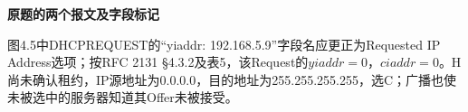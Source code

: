 {\color{ink}\bfseries 原题的两个报文及字段标记}\par\vspace{1bp}图4.5中DHCPREQUEST的“yiaddr: 192.168.5.9”字段名应更正为Requested IP Address选项；按RFC 2131 §4.3.2及表5，该Request的\(yiaddr=\allowbreak{}0\)，\(ciaddr=\allowbreak{}0\)。H尚未确认租约，IP源地址为0.0.0.0，目的地址为255.255.255.255，选C；广播也使未被选中的服务器知道其Offer未被接受。
